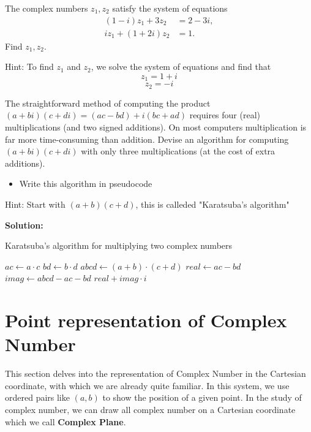 \begin{exercise}
    The complex numbers \( z_1, z_2 \) satisfy the system of equations
\begin{align*}
    (1 - i)z_1 + 3z_2 &= 2 - 3i, \\
    iz_1 + (1 + 2i)z_2 &= 1.
\end{align*}
Find \( z_1, z_2 \).
\end{exercise}
Hint: To find \( z_1 \) and \( z_2 \), we solve the system of equations and find that
\[ z_1 = 1 + i \]
\[ z_2 = -i \]

\begin{exercise}
    The straightforward method of computing the product \((a + bi)(c + di) = (ac - bd) + i(bc + ad)\) requires four (real) multiplications (and two signed additions). On most computers multiplication is far more time-consuming than addition. Devise an algorithm for computing \((a + bi)(c + di)\) with only three multiplications (at the cost of extra additions). 
    \begin{itemize}
        \item Write this algorithm in pseudocode
    \end{itemize}
\end{exercise}

\noindent Hint: Start with \((a + b)(c + d)\), this is calleded "Karatsuba's algorithm"

\noindent \textbf{Solution:}
\begin{algorithm}
    \caption{Karatsuba's algorithm for multiplying two complex numbers}
    \begin{algorithmic}[1]
    \State $ac \gets a \cdot c$
    \State $bd \gets b \cdot d$
    \State $abcd \gets (a + b) \cdot (c + d)$
    \State $real \gets ac - bd$
    \State $imag \gets abcd - ac - bd$
    \State \Return $real + imag \cdot i$
    \EndProcedure
    \end{algorithmic}
    \end{algorithm}

\section{Point representation of Complex Number}
This section delves into the representation of Complex Number in the Cartesian coordinate, with which we are 
already quite familiar. In this system, we use ordered pairs like $(a,b)$ to show the position of a given point.
In the study of complex number, we can draw all complex number on a Cartesian coordinate which we call \textbf{Complex Plane}.

